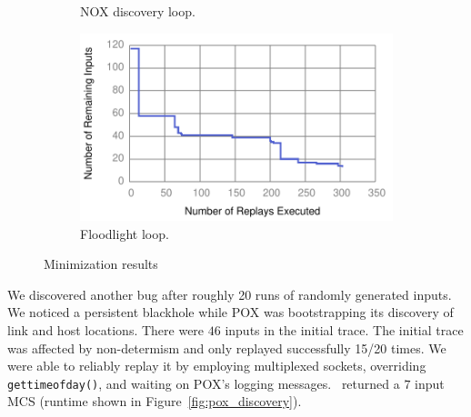 \begin{figure}[!htb]
\begin{subfigure}{0.32\textwidth}
    \caption[]{\label{fig:nox_discovery} NOX discovery loop. }
\end{subfigure}\hfill
\begin{subfigure}{0.32\textwidth}
    \includegraphics[width=\textwidth]{../graphs/runtime/floodlight_loop.pdf}
    \caption[]{\label{fig:fl_loop} Floodlight loop. }
\end{subfigure}
\caption{Minimization results}
\end{figure}


\begin{figure}[t]
\end{figure}
 We discovered another bug
after roughly 20 runs of randomly generated inputs. We noticed a persistent
blackhole while POX was bootstrapping its discovery of link and host locations.
There were $46$ inputs in the initial trace. The initial trace was affected by
non-determism and only replayed successfully 15/20 times.
We were able to reliably replay it by employing multiplexed sockets, overriding {\tt gettimeofday()},
and waiting on POX's logging messages. \projectname~returned a $7$ input MCS
(runtime shown in Figure~\ref{fig:pox_discovery}).


